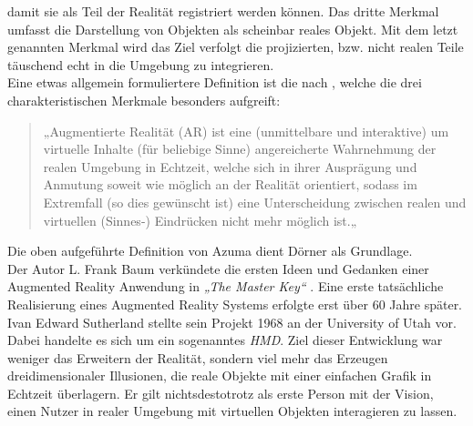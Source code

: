 damit sie als Teil der Realität registriert werden können. Das dritte Merkmal umfasst die Darstellung von Objekten als scheinbar reales 
Objekt. Mit dem letzt genannten Merkmal wird das Ziel verfolgt die projizierten, bzw. nicht realen Teile täuschend echt in die Umgebung zu 
integrieren.
\\ 
\linebreak  
Eine etwas allgemein formuliertere Definition ist die nach \cite{springer.2019s}, welche die drei charakteristischen Merkmale besonders 
aufgreift:
\begin{quote}
    „Augmentierte Realität (AR) ist eine (unmittelbare und interaktive) um virtuelle Inhalte (für beliebige Sinne) angereicherte Wahrnehmung der 
    realen Umgebung in Echtzeit, welche sich in ihrer Ausprägung und Anmutung soweit wie möglich an der Realität orientiert, sodass im 
    Extremfall (so dies gewünscht ist) eine Unterscheidung zwischen realen und virtuellen (Sinnes-) Eindrücken nicht mehr möglich ist.„ \cite{springer.2019s}
\end{quote}
Die oben aufgeführte Definition von Azuma dient Dörner als Grundlage.
\\ 
\linebreak
Der Autor L. Frank Baum \cite{frankbaum.1856m} verkündete die ersten Ideen und Gedanken einer Augmented Reality Anwendung in 
\textit{„The Master Key“} \cite{masterkey.1996f}. Eine erste tatsächliche Realisierung eines Augmented Reality Systems erfolgte erst über 
60 Jahre später. Ivan Edward Sutherland \cite{sutherlandbio.1938m} stellte sein Projekt 1968 an der University of Utah vor. Dabei handelte es 
sich um ein sogenanntes \textit{\ac{HMD}}. Ziel dieser Entwicklung war weniger das Erweitern der Realität, sondern viel mehr das Erzeugen dreidimensionaler 
Illusionen, die reale Objekte mit einer einfachen Grafik in Echtzeit überlagern. %
Er gilt nichtsdestotrotz als erste Person mit der Vision, einen Nutzer in realer Umgebung mit virtuellen Objekten interagieren zu lassen.
